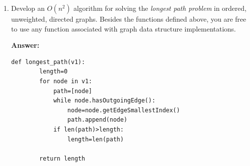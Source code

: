 \documentclass[12pt,letterpaper]{article}
\begin{document}
\begin{enumerate}
    \item Develop an $O(n^2)$ algorithm for solving the  \textit{longest path problem} in ordered, unweighted, directed graphs. 
    Besides the functions defined above, you are free to use any function associated with graph data structure implementations.
    \vspace{0.5cm}

    \textbf{Answer:}
    \begin{lstlisting}[style = Python]
    def longest_path(v1):
        length=0
        for node in v1:
            path=[node]
            while node.hasOutgoingEdge():
                node=node.getEdgeSmallestIndex()
                path.append(node)
            if len(path)>length:
                length=len(path)

        return length
    \end{lstlisting}
    
    
\end{enumerate}
\end{document}
